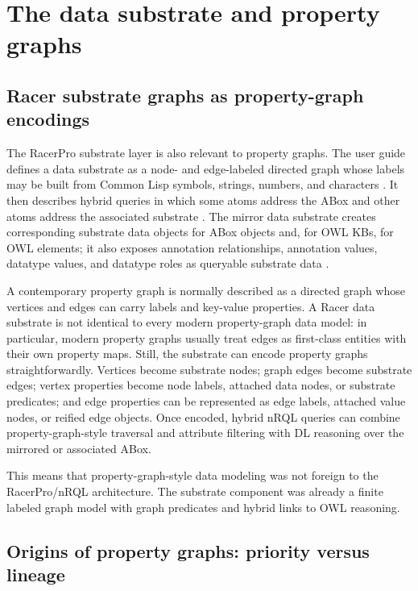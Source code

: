 \documentclass[11pt,letterpaper]{article}
\newcommand{\nrql}{nRQL}
\newcommand{\racer}{RacerPro}
\newcommand{\abox}{ABox}
\newcommand{\owl}{OWL}
\begin{document}
\section{The data substrate and property graphs}

\subsection{Racer substrate graphs as property-graph encodings}

The RacerPro substrate layer is also relevant to property graphs. The user guide defines a data substrate as a node- and edge-labeled directed graph whose labels may be built from Common Lisp symbols, strings, numbers, and characters \cite[p.~133]{racerug}. It then describes hybrid queries in which some atoms address the \abox{} and other atoms address the associated substrate \cite[pp.~133--137]{racerug}. The mirror data substrate creates corresponding substrate data objects for \abox{} objects and, for \owl{} KBs, for \owl{} elements; it also exposes annotation relationships, annotation values, datatype values, and datatype roles as queryable substrate data \cite[pp.~137--143]{racerug}.

A contemporary property graph is normally described as a directed graph whose vertices and edges can carry labels and key-value properties. A Racer data substrate is not identical to every modern property-graph data model: in particular, modern property graphs usually treat edges as first-class entities with their own property maps. Still, the substrate can encode property graphs straightforwardly. Vertices become substrate nodes; graph edges become substrate edges; vertex properties become node labels, attached data nodes, or substrate predicates; and edge properties can be represented as edge labels, attached value nodes, or reified edge objects. Once encoded, hybrid \nrql{} queries can combine property-graph-style traversal and attribute filtering with DL reasoning over the mirrored or associated \abox{}.

This means that property-graph-style data modeling was not foreign to the \racer{}/\nrql{} architecture. The substrate component was already a finite labeled graph model with graph predicates and hybrid links to \owl{} reasoning.

\subsection{Origins of property graphs: priority versus lineage}
\end{document}
